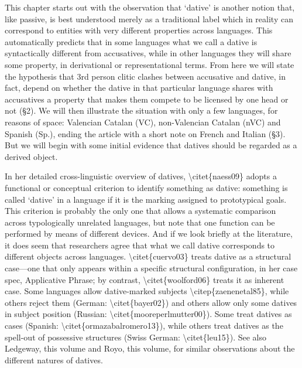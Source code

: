 \documentclass[12pt]{article}
\newenvironment{styleStandard}{\setlength\leftskip{0cm}\setlength\rightskip{0cm}\setlength\parindent{0cm}\setlength\parfillskip{0pt plus 1fil}\setlength\parskip{0in plus 1pt}\writerlistparindent\writerlistleftskip\leavevmode\normalfont\normalsize\writerlistlabel\ignorespaces}{\unskip\vspace{0.111in plus 0.0111in}\par}
\newcommand\writerlistleftskip{}
\newcommand\writerlistparindent{}
\newcommand\writerlistlabel{}
\begin{document}
\begin{styleStandard}
This chapter starts out with the observation that ‘dative’ is another notion that, like passive, is best understood merely as a traditional label which in reality can correspond to entities with very different properties across languages. This automatically predicts that in some languages what we call a dative is syntactically different from accusatives, while in other languages they will share some property, in derivational or representational terms. From here we will state the hypothesis that 3rd person clitic clashes between accusative and dative, in fact, depend on whether the dative in that particular language shares with accusatives a property that makes them compete to be licensed by one head or not (§2). We will then illustrate the situation with only a few languages, for reasons of space: Valencian Catalan (VC), non-Valencian Catalan (nVC) and Spanish (Sp.), ending the article with a short note on French and Italian (§3). But we will begin with some initial evidence that datives should be regarded as a derived object.
\end{styleStandard}

\begin{styleStandard}
In her detailed cross-linguistic overview of datives, {\textbackslash}citet\{naess09\} adopts a functional or conceptual criterion to identify something as dative: something is called ‘dative’ in a language if it is the marking assigned to prototypical goals. This criterion is probably the only one that allows a systematic comparison across typologically unrelated languages, but note that one function can be performed by means of different devices. And if we look briefly at the literature, it does seem that researchers agree that what we call dative corresponds to different objects across languages. {\textbackslash}citet\{cuervo03\} treats dative as a structural case—one that only appears within a specific structural configuration, in her case spec, Applicative Phrase; by contrast, {\textbackslash}citet\{woolford06\} treats it as inherent case. Some languages allow dative-marked subjects {\textbackslash}citep\{zaenenetal85\}, while others reject them (German: {\textbackslash}citet\{bayer02\}) and others allow only some datives in subject position (Russian: {\textbackslash}citet\{mooreperlmutter00\}). Some treat datives as cases (Spanish: {\textbackslash}citet\{ormazabalromero13\}), while others treat datives as the spell-out of possessive structures (Swiss German: {\textbackslash}citet\{leu15\}). See also Ledgeway, this volume and Royo, this volume, for similar observations about the different natures of datives.
\end{styleStandard}
\end{document}
